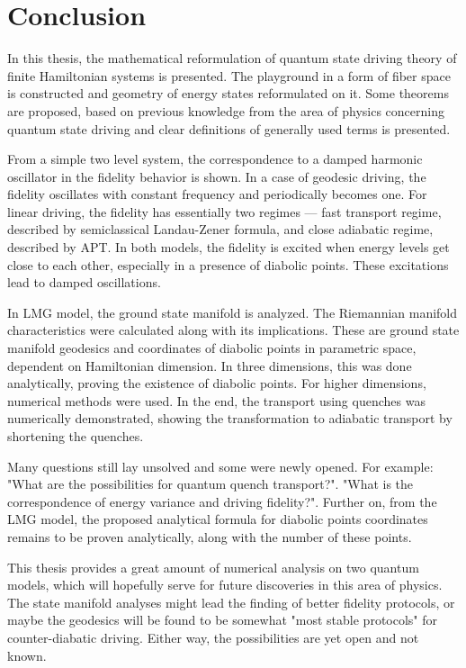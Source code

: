\chapter*{Conclusion}
In this thesis, the mathematical reformulation of quantum state driving theory of finite Hamiltonian systems is presented. The playground in a form of fiber space is constructed and geometry of energy states reformulated on it. Some theorems are proposed, based on previous knowledge from the area of physics concerning quantum state driving and clear definitions of generally used terms is presented.

From a simple two level system, the correspondence to a damped harmonic oscillator in the fidelity behavior is shown. In a case of geodesic driving, the fidelity oscillates with constant frequency and periodically becomes one. For linear driving, the fidelity has essentially two regimes — fast transport regime, described by semiclassical Landau-Zener formula, and close adiabatic regime, described by APT. In both models, the fidelity is excited when energy levels get close to each other, especially in a presence of diabolic points. These excitations lead to damped oscillations.

In LMG model, the ground state manifold is analyzed. The Riemannian manifold characteristics were calculated along with its implications. These are ground state manifold geodesics and coordinates of diabolic points in parametric space, dependent on Hamiltonian dimension. In three dimensions, this was done analytically, proving the existence of diabolic points. For higher dimensions, numerical methods were used. In the end, the transport using quenches was numerically demonstrated, showing the transformation to adiabatic transport by shortening the quenches.

Many questions still lay unsolved and some were newly opened. For example: "What are the possibilities for quantum quench transport?". "What is the correspondence of energy variance and driving fidelity?". Further on, from the LMG model, the proposed analytical formula for diabolic points coordinates remains to be proven analytically, along with the number of these points.

This thesis provides a great amount of numerical analysis on two quantum models, which will hopefully serve for future discoveries in this area of physics. The state manifold analyses might lead the finding of better fidelity protocols, or maybe the geodesics will be found to be somewhat "most stable protocols" for counter-diabatic driving. Either way, the possibilities are yet open and not known.
